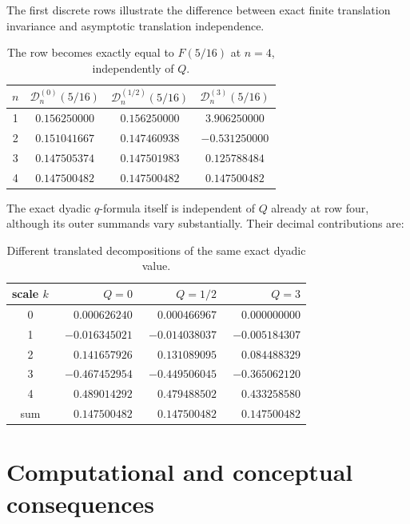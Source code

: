 \documentclass[11pt,oneside]{article}
\theoremstyle{definition}
\theoremstyle{remark}
\begin{document}
The first discrete rows illustrate the difference between exact finite translation invariance
and asymptotic translation independence.

\begin{table}[ht]
\centering
\small
\begin{tabular}{@{}c c c c@{}}
\toprule
$n$ & $\mathcal D_n^{(0)}(5/16)$ & $\mathcal D_n^{(1/2)}(5/16)$ & $\mathcal D_n^{(3)}(5/16)$ \\
\midrule
1 & $0.156250000$ & $0.156250000$ & $3.906250000$ \\
2 & $0.151041667$ & $0.147460938$ & $-0.531250000$ \\
3 & $0.147505374$ & $0.147501983$ & $0.125788484$ \\
4 & $0.147500482$ & $0.147500482$ & $0.147500482$ \\
\bottomrule
\end{tabular}
\caption{The row becomes exactly equal to $F(5/16)$ at $n=4$, independently of $Q$.}
\label{tab:five-sixteen-D}
\end{table}

The exact dyadic $q$-formula itself is independent of $Q$ already at row four, although its
outer summands vary substantially.  Their decimal contributions are:

\begin{table}[ht]
\centering
\small
\begin{tabular}{@{}c r r r@{}}
\toprule
scale $k$ & $Q=0$ & $Q=1/2$ & $Q=3$ \\
\midrule
0 & $\phantom{-}0.000626240$ & $\phantom{-}0.000466967$ & $\phantom{-}0.000000000$ \\
1 & $-0.016345021$ & $-0.014038037$ & $-0.005184307$ \\
2 & $\phantom{-}0.141657926$ & $\phantom{-}0.131089095$ & $\phantom{-}0.084488329$ \\
3 & $-0.467452954$ & $-0.449506045$ & $-0.365062120$ \\
4 & $\phantom{-}0.489014292$ & $\phantom{-}0.479488502$ & $\phantom{-}0.433258580$ \\
\midrule
sum & $0.147500482$ & $0.147500482$ & $0.147500482$ \\
\bottomrule
\end{tabular}
\caption{Different translated decompositions of the same exact dyadic value.}
\label{tab:five-sixteen-q-terms}
\end{table}

\section{Computational and conceptual consequences}
\label{sec:consequences}
\end{document}
